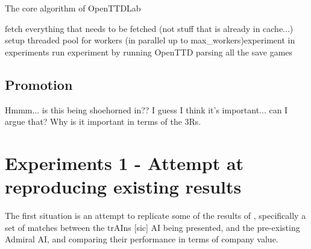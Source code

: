 \documentclass[logo,msc,dsti]{infthesis}    %
\begin{document}
{\begin{algorithm}
\caption{The core algorithm of OpenTTDLab}\label{alg:three}
 fetch everything that needs to be fetched (not stuff that is already in cache...)\;
 setup threaded pool for workers\;
 \ForEach(in parallel up to {max\_workers}){experiment in experiments}{
  run experiment by running OpenTTD\;
  parsing all the save games\;
 }
\end{algorithm}


\section{Promotion}

Hmmm... is this being shoehorned in?? I guess I think it's important... can I argue that? Why is it important in terms of the 3Rs.





\chapter{Experiments 1 - Attempt at reproducing existing results}
\label{chapter:experiments-attempt-at-reproducing}

The first situation is an attempt to replicate some of the results of \cite{rios2009trains}, specifically a set of matches between the trAIns [sic] AI being presented, and the pre-existing Admiral AI, and comparing their performance in terms of company value.

}
\end{document}
